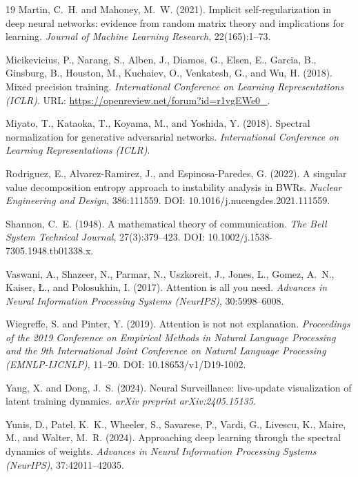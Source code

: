 \documentclass[11pt,a4paper]{article}
\theoremstyle{plain}
\begin{document}
\begin{thebibliography}{19}
Martin, C.~H. and Mahoney, M.~W. (2021).
Implicit self-regularization in deep neural networks: evidence from random matrix theory and implications for learning.
\emph{Journal of Machine Learning Research}, 22(165):1--73.

Micikevicius, P., Narang, S., Alben, J., Diamos, G., Elsen, E., Garcia, B., Ginsburg, B., Houston, M., Kuchaiev, O., Venkatesh, G., and Wu, H. (2018).
Mixed precision training.
\emph{International Conference on Learning Representations (ICLR)}.
URL: \url{https://openreview.net/forum?id=r1vgEWe0_}.

Miyato, T., Kataoka, T., Koyama, M., and Yoshida, Y. (2018).
Spectral normalization for generative adversarial networks.
\emph{International Conference on Learning Representations (ICLR)}.

Rodriguez, E., Alvarez-Ramirez, J., and Espinosa-Paredes, G. (2022).
A singular value decomposition entropy approach to instability analysis in BWRs.
\emph{Nuclear Engineering and Design}, 386:111559.
DOI: 10.1016/j.nucengdes.2021.111559.

Shannon, C.~E. (1948).
A mathematical theory of communication.
\emph{The Bell System Technical Journal}, 27(3):379--423.
DOI: 10.1002/j.1538-7305.1948.tb01338.x.

Vaswani, A., Shazeer, N., Parmar, N., Uszkoreit, J., Jones, L., Gomez, A.~N., Kaiser, {\L}., and Polosukhin, I. (2017).
Attention is all you need.
\emph{Advances in Neural Information Processing Systems (NeurIPS)}, 30:5998--6008.

Wiegreffe, S. and Pinter, Y. (2019).
Attention is not not explanation.
\emph{Proceedings of the 2019 Conference on Empirical Methods in Natural Language Processing and the 9th International Joint Conference on Natural Language Processing (EMNLP-IJCNLP)}, 11--20.
DOI: 10.18653/v1/D19-1002.

Yang, X. and Dong, J.~S. (2024).
Neural Surveillance: live-update visualization of latent training dynamics.
\emph{arXiv preprint arXiv:2405.15135}.

Yunis, D., Patel, K.~K., Wheeler, S., Savarese, P., Vardi, G., Livescu, K., Maire, M., and Walter, M.~R. (2024).
Approaching deep learning through the spectral dynamics of weights.
\emph{Advances in Neural Information Processing Systems (NeurIPS)}, 37:42011--42035.


\end{thebibliography}
\end{document}
